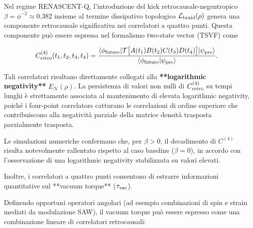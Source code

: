 \documentclass[11pt,a4paper]{article}
\theoremstyle{plain}
\theoremstyle{definition}
\begin{document}
Nel regime RENASCENT-Q, l’introduzione del kick retrocausale-negentropico $\beta = \phi^{-2} \approx 0.382$ insieme al termine dissipativo topologico $\mathcal{L}_{\rm braid}(\rho)$ genera una componente retrocausale significativa nei correlatori a quattro punti. Questa componente può essere espressa nel formalismo two-state vector (TSVF) come

\vspace{0.3cm}

\begin{tcolorbox}[
  colback=cyan!5!white, 
  colframe=cyan!50!black, 
  title=Correlatore four-point retrocausale (TSVF), 
  fonttitle=\bfseries,
  breakable,
  enhanced,
  width=\textwidth,
  boxrule=0.8pt,
  arc=5pt
]
\begin{equation}
C^{(4)}_{\rm retro}(t_1,t_2,t_3,t_4) = \frac{\langle \phi_{\rm future} | \mathcal{T} \bigl[ A(t_1) B(t_2) C(t_3) D(t_4) \bigr] | \psi_{\rm pre} \rangle}{\langle \phi_{\rm future} | \psi_{\rm pre} \rangle}.
\label{eq:four_point_retro}
\end{equation}
\end{tcolorbox}

\vspace{0.3cm}


Tali correlatori risultano direttamente collegati alla \textbf{**logarithmic negativity**} $E_{\mathcal{N}}(\rho)$. La persistenza di valori non nulli di $C^{(4)}_{\rm retro}$ su tempi lunghi è strettamente associata al mantenimento di elevata logarithmic negativity, poiché i four-point correlators catturano le correlazioni di ordine superiore che contribuiscono alla negatività parziale della matrice densità trasposta parzialmente trasposta. 


\vspace{0.3cm}



Le simulazioni numeriche confermano che, per $\beta > 0$, il decadimento di $C^{(4)}$ risulta notevolmente rallentato rispetto al caso baseline ($\beta=0$), in accordo con l’osservazione di una logarithmic negativity stabilizzata su valori elevati.


\vspace{0.3cm}

Inoltre, i correlatori a quattro punti consentono di estrarre informazioni quantitative sul **vacuum torque** ($\tau_{\rm vac}$). 

\vspace{0.2cm}


Definendo opportuni operatori angolari (ad esempio combinazioni di spin e strain mediati da modulazione SAW), il vacuum torque può essere espresso come una combinazione lineare di correlatori retrocausali:
\end{document}
